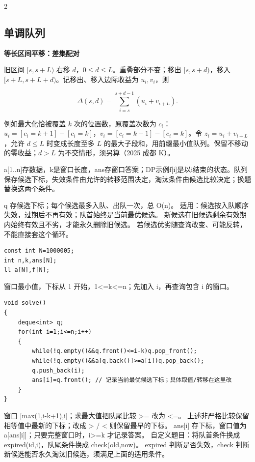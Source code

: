 \documentclass[UTF8,fontset=fandol,a4paper,twoside]{ctexart}
\newcommand{\topic}[1]{\par\smallskip\textbf{#1}\par\nobreak}
\newcommand{\note}[1]{{\fontsize{10}{12}\selectfont #1\par}}
\begin{document}
\begin{multicols}{2}
\subsection{单调队列}

\topic{等长区间平移：差集配对}
\note{旧区间 $[s,s+L)$ 右移 $d$，$0\le d\le L$。重叠部分不变；移出 $[s,s+d)$，移入 $[s+L,s+L+d)$。记移出、移入边际收益为 $u_i,v_i$，则}
\[\Delta(s,d)=\sum_{i=s}^{s+d-1}(u_i+v_{i+L}).\]
\note{例如最大化恰被覆盖 $k$ 次的位置数，原覆盖次数为 $c_i$：$u_i=[c_i=k+1]-[c_i=k]$，$v_i=[c_i=k-1]-[c_i=k]$。令 $z_i=u_i+v_{i+L}$，允许 $d\le L$ 时变成长度至多 $L$ 的最大子段和，用前缀最小值队列。保留不移动的零收益；$d>L$ 为不交情形，须另算（2025 成都 K）。}

\note{a[\allowbreak{}1.\allowbreak{}.\allowbreak{}n]\allowbreak{}存数据，k是窗口长度，ans存窗口答案；DP示例f[\allowbreak{}i]\allowbreak{}是以i结束的状态。队列保存候选下标，失效条件由允许的转移范围决定，淘汰条件由候选比较决定；换题替换这两个条件。}
\note{q 存候选下标；每个候选最多入队、出队一次，总 O(\allowbreak{}n)\allowbreak{}。 适用：候选按入队顺序失效，过期后不再有效；队首始终是当前最优候选。 新候选在旧候选剩余有效期内始终有效且不劣，才能永久删除旧候选。 若候选优劣随查询改变、可能反转，不能直接套这个循环。}
\begin{lstlisting}
const int N=1000005;
int n,k,ans[N];
ll a[N],f[N];
\end{lstlisting}
\note{窗口最小值，下标从 1 开始，1<\allowbreak{}=\allowbreak{}k<\allowbreak{}=\allowbreak{}n；先加入 i，再查询包含 i 的窗口。}
\begin{lstlisting}
void solve()
{
    deque<int> q;
    for(int i=1;i<=n;i++)
    {
        while(!q.empty()&&q.front()<=i-k)q.pop_front();
        while(!q.empty()&&a[q.back()]>=a[i])q.pop_back();
        q.push_back(i);
        ans[i]=q.front(); // 记录当前最优候选下标；具体取值/转移在这里改
    }
}
\end{lstlisting}
\note{窗口 [\allowbreak{}max(\allowbreak{}1,\allowbreak{}i-\allowbreak{}k+\allowbreak{}1)\allowbreak{},\allowbreak{}i]\allowbreak{}；求最大值把队尾比较 >\allowbreak{}=\allowbreak{} 改为 <\allowbreak{}=\allowbreak{}。 上述非严格比较保留相等值中最新的下标；改成 >\allowbreak{} /\allowbreak{} <\allowbreak{} 则保留最早的下标。 ans[\allowbreak{}i]\allowbreak{} 存下标，窗口值为 a[\allowbreak{}ans[\allowbreak{}i]\allowbreak{}]\allowbreak{}；只要完整窗口时，i>\allowbreak{}=\allowbreak{}k 才记录答案。 自定义题目：将队首条件换成 expired(\allowbreak{}id,\allowbreak{}i)\allowbreak{}，队尾条件换成 check(\allowbreak{}old,\allowbreak{}now)\allowbreak{}。 expired 判断是否失效，check 判断新候选能否永久淘汰旧候选，须满足上面的适用条件。}

\end{multicols}
\end{document}
